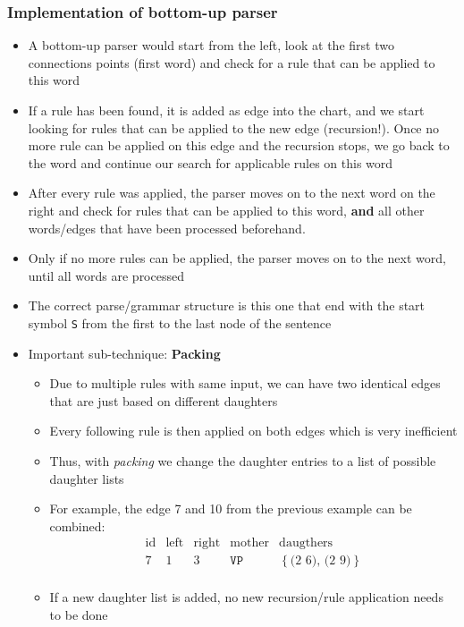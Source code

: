 \subsubsection{Implementation of bottom-up parser}
\begin{itemize}
	\item A bottom-up parser would start from the left, look at the first two connections points (first word) and check for a rule that can be applied to this word
	\item If a rule has been found, it is added as edge into the chart, and we start looking for rules that can be applied to the new edge (recursion!). Once no more rule can be applied on this edge and the recursion stops, we go back to the word and continue our search for applicable rules on this word 
	\item After every rule was applied, the parser moves on to the next word on the right and check for rules that can be applied to this word, \textbf{and} all other words/edges that have been processed beforehand. 
	\item Only if no more rules can be applied, the parser moves on to the next word, until all words are processed
	\item The correct parse/grammar structure is this one that end with the start symbol \texttt{S} from the first to the last node of the sentence
	\item Important sub-technique: \textbf{Packing}
	\begin{itemize}
		\item Due to multiple rules with same input, we can have two identical edges that are just based on different daughters
		\item Every following rule is then applied on both edges which is very inefficient
		\item Thus, with \textit{packing} we change the daughter entries to a list of possible daughter lists 
		\item For example, the edge 7 and 10 from the previous example can be combined:
		$$\begin{array}{ccccc}
		\text{id} & \text{left} & \text{right} & \text{mother} & \text{daugthers}\\
		\hline
		7 & 1 & 3 & \texttt{VP} & \left\{\text{(2 6), (2 9)}\right\}\\
		\end{array}$$
		\item If a new daughter list is added, no new recursion/rule application needs to be done  
	\end{itemize}
\end{itemize}
